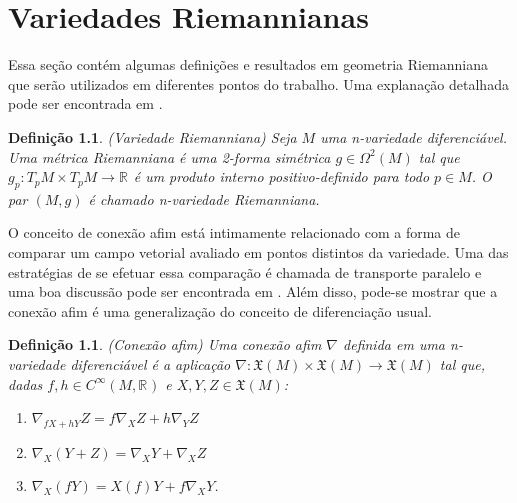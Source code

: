 \documentclass[12pt]{book}
\newtheorem{definicao}[teorema]{Definição}
\newcommand{\campossuaves}[1]{\mathfrak{X}(#1)}
\newcommand{\funcoessuaves}[1]{C^{\infty}(#1, \real{})}
\newcommand{\real}[1]{\mathbb{R}^{#1}}
\begin{document}
	\chapter{Variedades Riemannianas}\label{apendice_variedade_riemanniana}
	
	Essa seção contém algumas definições e resultados em geometria Riemanniana que serão utilizados em diferentes pontos do trabalho. Uma explanação detalhada pode ser encontrada em \cite{manfredo_riemannian_geo}.
	
	\begin{definicao}\label{definicao_variedade_riemanniana}
		(Variedade Riemanniana) Seja $M$ uma n-variedade diferenciável. Uma métrica Riemanniana é uma 2-forma simétrica $g \in \Omega^{2}(M)$ tal que $g_{p}:T_{p}M \times T_{p}M \to \real{}$ é um produto interno positivo-definido para todo $p \in M$. O par $(M, g)$ é chamado n-variedade Riemanniana.
	\end{definicao}
	
	O conceito de conexão afim está intimamente relacionado com a forma de comparar um campo vetorial avaliado em pontos distintos da variedade. Uma das estratégias de se efetuar essa comparação é chamada de transporte paralelo e uma boa discussão pode ser encontrada em \cite{nakahara}. Além disso, pode-se mostrar que a conexão afim é uma generalização do conceito de diferenciação usual.
	
	\begin{definicao}\label{definicao_conexao_afim}
		(Conexão afim) Uma conexão afim $\nabla$ definida em uma n-variedade diferenciável é a aplicação $\nabla: \campossuaves{M} \times \campossuaves{M} \to \campossuaves{M}$ tal que, dadas $f,h \in \funcoessuaves{M}$ e $X,Y,Z \in \campossuaves{M}$:
		\begin{enumerate}
			\item $\nabla_{fX+hY}Z = f\nabla_{X}Z+h\nabla_{Y}Z$
			\item $\nabla_{X}(Y+Z) = \nabla_{X}Y+ \nabla_{X}Z$
			\item $\nabla_{X}(fY) = X(f)Y+f\nabla_{X}Y$.
		\end{enumerate}
	\end{definicao}
	
\end{document}

